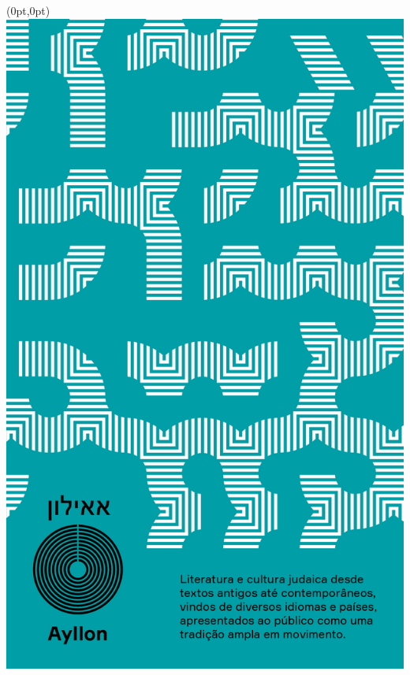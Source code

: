\pagestyle{ayllon}
\label{ayllon}


\begin{textblock*}{5.625in}(0pt,0pt)%
\vspace*{-3.2cm}
\hspace*{-1.95cm}\includegraphics*[width=160mm]{./imgs/AYLLON.png}
\end{textblock*}

\pagebreak %

